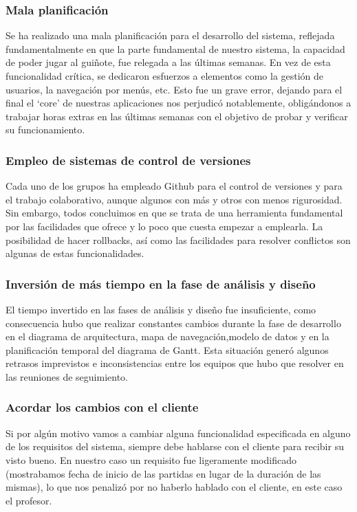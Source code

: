 \documentclass{article}
\begin{document}
\subsubsection*{Mala planificación}
Se ha realizado una mala planificación para el desarrollo del sistema, reflejada fundamentalmente en que la parte fundamental de nuestro sistema, la capacidad de poder jugar al guiñote, fue relegada a las últimas semanas. En vez de esta funcionalidad crítica, se dedicaron esfuerzos a elementos como la gestión de usuarios, la navegación por menús, etc. Esto fue un grave error, dejando para el final el ‘core’ de nuestras aplicaciones nos perjudicó notablemente, obligándonos a trabajar horas extras en las últimas semanas con el objetivo de probar y verificar su funcionamiento.

\subsubsection*{Empleo de sistemas de control de versiones}
Cada uno de los grupos ha empleado Github para el control de versiones y para el trabajo colaborativo, aunque algunos con más y otros con menos rigurosidad. Sin embargo, todos concluimos en que se trata de una herramienta fundamental por las facilidades que ofrece y lo poco que cuesta empezar a emplearla. La posibilidad de hacer rollbacks, así como las facilidades para resolver conflictos son algunas de estas funcionalidades.

\subsubsection*{Inversión de más tiempo en la fase de análisis y diseño}
El tiempo invertido en las fases de análisis y diseño fue insuficiente, como consecuencia hubo que realizar constantes cambios durante la fase de desarrollo en el diagrama de arquitectura, mapa de navegación,modelo de datos y en la planificación temporal del diagrama de Gantt. Esta situación generó algunos retrasos imprevistos e inconsistencias entre los equipos que hubo que resolver en las reuniones de seguimiento.

\subsubsection*{Acordar los cambios con el cliente}
Si por algún motivo vamos a cambiar alguna funcionalidad especificada en alguno de los requisitos del sistema, siempre debe hablarse con el cliente para recibir su visto bueno. En nuestro caso un requisito fue ligeramente modificado (mostrabamos fecha de inicio de las partidas en lugar de la duración de las mismas), lo que nos penalizó por no haberlo hablado con el cliente, en este caso el profesor.
\end{document}
